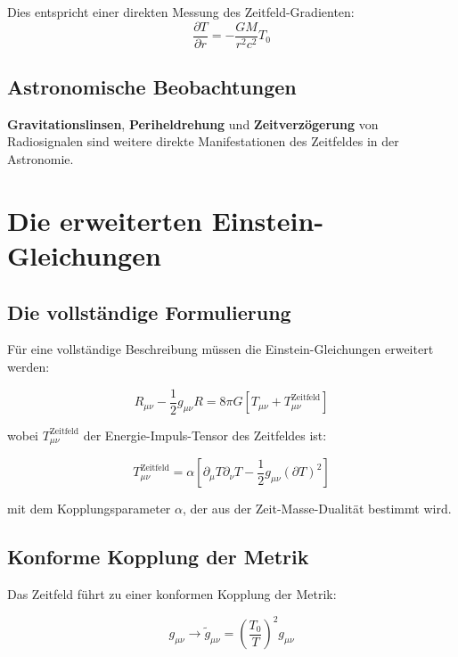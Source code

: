 \documentclass[12pt,a4paper]{report}
\begin{document}
Dies entspricht einer direkten Messung des Zeitfeld-Gradienten:
\begin{equation}
	\frac{\partial T}{\partial r} = -\frac{GM}{r^2c^2} T_0
\end{equation}

\subsection{Astronomische Beobachtungen}

\textbf{Gravitationslinsen}, \textbf{Periheldrehung} und \textbf{Zeitverzögerung} von Radiosignalen sind weitere direkte Manifestationen des Zeitfeldes in der Astronomie.

\section{Die erweiterten Einstein-Gleichungen}

\subsection{Die vollständige Formulierung}

Für eine vollständige Beschreibung müssen die Einstein-Gleichungen erweitert werden:

\begin{equation}
	R_{\mu\nu} - \frac{1}{2}g_{\mu\nu}R = 8\pi G[T_{\mu\nu} + T_{\mu\nu}^{\text{Zeitfeld}}]
\end{equation}

wobei $T_{\mu\nu}^{\text{Zeitfeld}}$ der Energie-Impuls-Tensor des Zeitfeldes ist:

\begin{equation}
	T_{\mu\nu}^{\text{Zeitfeld}} = \alpha[\partial_\mu T \partial_\nu T - \frac{1}{2}g_{\mu\nu}(\partial T)^2]
\end{equation}

mit dem Kopplungsparameter $\alpha$, der aus der Zeit-Masse-Dualität bestimmt wird.

\subsection{Konforme Kopplung der Metrik}

Das Zeitfeld führt zu einer konformen Kopplung der Metrik:

\begin{equation}
	g_{\mu\nu} \to \tilde{g}_{\mu\nu} = \left(\frac{T_0}{T}\right)^2 g_{\mu\nu}
\end{equation}
\end{document}
